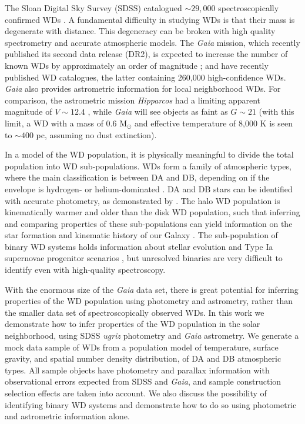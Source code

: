 \documentclass[fleqn,usenatbib]{mnras}
\begin{document}
The Sloan Digital Sky Survey (SDSS) catalogued ${\sim}29,000$ spectroscopically confirmed WDs \citep{2013ApJS..204....5K,2015MNRAS.446.4078K}. A fundamental difficulty in studying WDs is that their mass is degenerate with distance. This degeneracy can be broken with high quality spectrometry and accurate atmospheric models. The \emph{Gaia} mission, which recently published its second data release (DR2), is expected to increase the number of known WDs by approximately an order of magnitude \citep{Jordan:2006jg,2014A&A...565A..11C}; \cite{2018arXiv180702559J} and \cite{2018arXiv180703315G} have recently published WD catalogues, the latter containing 260,000 high-confidence WDs. \emph{Gaia} also provides astrometric information for local neighborhood WDs. For comparison, the astrometric mission \emph{Hipparcos} had a limiting apparent magnitude of $V \sim 12.4$ \citep{1997A&A...323L..49P}, while \emph{Gaia} will see objects as faint as $G \sim 21$ (with this limit, a WD with a mass of 0.6 M$_\odot$ and effective temperature of 8,000 K is seen to ${\sim}400$ pc, assuming no dust extinction).

In a model of the WD population, it is physically meaningful to divide the total population into WD sub-populations. WDs form a family of atmospheric types, where the main classification is between DA and DB, depending on if the envelope is hydrogen- or helium-dominated \citep{Tremblay:2007hq,2011ApJ...737...28B,2015A&A...583A..86K}. DA and DB stars can be identified with accurate photometry, as demonstrated by \cite{Mortlock:2008gf}. The halo WD population is kinematically warmer and older than the disk WD population, such that inferring and comparing properties of these sub-populations can yield information on the star formation and kinematic history of our Galaxy \citep{1998ApJ...503..239I,2016MNRAS.463.2453D}. The sub-population of binary WD systems holds information about stellar evolution \citep{Postnov:2014tza} and Type Ia supernovae progenitor scenarios \citep{Livio:2018rue}, but unresolved binaries are very difficult to identify even with high-quality spectroscopy.

With the enormous size of the \emph{Gaia} data set, there is great potential for inferring properties of the WD population using photometry and astrometry, rather than the smaller data set of spectroscopically observed WDs. In this work we demonstrate how to infer properties of the WD population in the solar neighborhood, using SDSS \emph{ugriz} photometry and \emph{Gaia} astrometry. We generate a mock data sample of WDs from a population model of temperature, surface gravity, and spatial number density distribution, of DA and DB atmospheric types. All sample objects have photometry and parallax information with observational errors expected from SDSS and \emph{Gaia}, and sample construction selection effects are taken into account. We also discuss the possibility of identifying binary WD systems and demonstrate how to do so using photometric and astrometric information alone.
\end{document}
